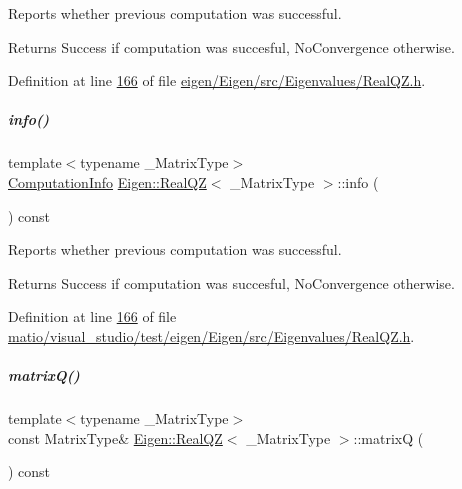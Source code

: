 Reports whether previous computation was successful. 

\begin{DoxyReturn}{Returns}
{\ttfamily Success} if computation was succesful, {\ttfamily No\+Convergence} otherwise. 
\end{DoxyReturn}


Definition at line \hyperlink{eigen_2_eigen_2src_2_eigenvalues_2_real_q_z_8h_source_l00166}{166} of file \hyperlink{eigen_2_eigen_2src_2_eigenvalues_2_real_q_z_8h_source}{eigen/\+Eigen/src/\+Eigenvalues/\+Real\+Q\+Z.\+h}.

\mbox{\label{group___eigenvalues___module_a36bd77afed89f3f5c110a715e69e4c64}} 
\subparagraph{\texorpdfstring{info()}{info()}\hspace{0.1cm}{\footnotesize\ttfamily [2/2]}}
{\footnotesize\ttfamily template$<$typename \+\_\+\+Matrix\+Type$>$ \\
\hyperlink{group__enums_ga85fad7b87587764e5cf6b513a9e0ee5e}{Computation\+Info} \hyperlink{group___eigenvalues___module_class_eigen_1_1_real_q_z}{Eigen\+::\+Real\+QZ}$<$ \+\_\+\+Matrix\+Type $>$\+::info (\begin{DoxyParamCaption}{ }\end{DoxyParamCaption}) const\hspace{0.3cm}{\ttfamily [inline]}}



Reports whether previous computation was successful. 

\begin{DoxyReturn}{Returns}
{\ttfamily Success} if computation was succesful, {\ttfamily No\+Convergence} otherwise. 
\end{DoxyReturn}


Definition at line \hyperlink{matio_2visual__studio_2test_2eigen_2_eigen_2src_2_eigenvalues_2_real_q_z_8h_source_l00166}{166} of file \hyperlink{matio_2visual__studio_2test_2eigen_2_eigen_2src_2_eigenvalues_2_real_q_z_8h_source}{matio/visual\+\_\+studio/test/eigen/\+Eigen/src/\+Eigenvalues/\+Real\+Q\+Z.\+h}.

\mbox{\label{group___eigenvalues___module_a212bc2f69ea4eff830fde70e209e40fb}} 
\subparagraph{\texorpdfstring{matrix\+Q()}{matrixQ()}\hspace{0.1cm}{\footnotesize\ttfamily [1/2]}}
{\footnotesize\ttfamily template$<$typename \+\_\+\+Matrix\+Type$>$ \\
const Matrix\+Type\& \hyperlink{group___eigenvalues___module_class_eigen_1_1_real_q_z}{Eigen\+::\+Real\+QZ}$<$ \+\_\+\+Matrix\+Type $>$\+::matrixQ (\begin{DoxyParamCaption}{ }\end{DoxyParamCaption}) const\hspace{0.3cm}{\ttfamily [inline]}}



